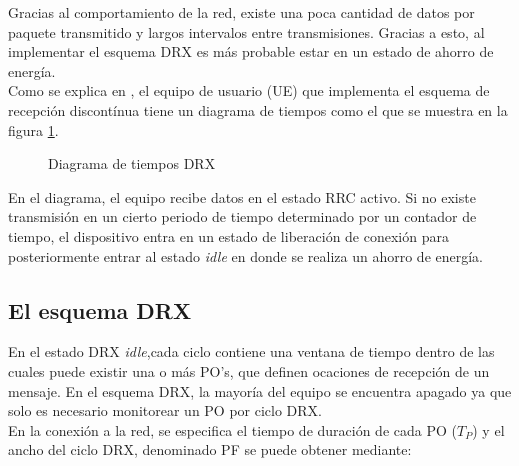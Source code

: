 \documentclass[journal]{IEEEtran}
\begin{document}
Gracias al comportamiento de la red, existe una poca cantidad de datos por paquete transmitido y largos intervalos entre transmisiones. Gracias a esto, al implementar el esquema DRX es más probable estar en un estado de ahorro de energía.\\

Como se explica en \cite{paper2}, el equipo de usuario (UE) que implementa el esquema de recepción discontínua tiene un diagrama de tiempos como el que se muestra en la figura \ref{tiemposDRX}. 

\begin{figure}[h]
\centering
{}
\caption{Diagrama de tiempos DRX}
\label{tiemposDRX}
\end{figure}

En el diagrama, el equipo recibe datos en el estado RRC activo. Si no existe transmisión en un cierto periodo de tiempo determinado por un contador de tiempo, el dispositivo entra en un estado de liberación de conexión para posteriormente entrar al estado \textit{idle} en donde se realiza un ahorro de energía.\\

\subsection{El esquema DRX}

En el estado DRX \textit{idle},cada ciclo contiene una ventana de tiempo dentro de las cuales puede existir una o más PO's, que definen ocaciones de recepción de un mensaje. En el esquema DRX, la mayoría del equipo se encuentra apagado ya que solo es necesario monitorear un PO por ciclo DRX.\\

En la conexión a la red, se especifica el tiempo de duración de cada PO ($T_{P}$) y el ancho del ciclo DRX, denominado PF se puede obtener mediante:\\
\end{document}
